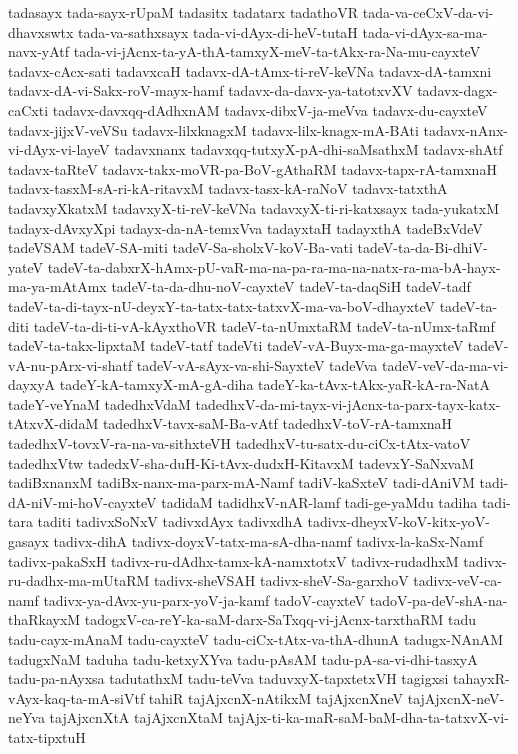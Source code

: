 {tadasayx
tada-sayx-rUpaM
tadasitx
tadatarx
tadathoVR
tada-va-ceCxV-da-vi-dhavxswtx
tada-va-sathxsayx
tada-vi-dAyx-di-heV-tutaH
tada-vi-dAyx-sa-ma-navx-yAtf
tada-vi-jAcnx-ta-yA-thA-tamxyX-meV-ta-tAkx-ra-Na-mu-cayxteV
tadavx-cAcx-sati
tadavxcaH
tadavx-dA-tAmx-ti-reV-keVNa
tadavx-dA-tamxni
tadavx-dA-vi-Sakx-roV-mayx-hamf
tadavx-da-davx-ya-tatotxvXV
tadavx-dagx-caCxti
tadavx-davxqq-dAdhxnAM
tadavx-dibxV-ja-meVva
tadavx-du-cayxteV
tadavx-jijxV-veVSu
tadavx-lilxknagxM
tadavx-lilx-knagx-mA-BAti
tadavx-nAnx-vi-dAyx-vi-layeV
tadavxnanx
tadavxqq-tutxyX-pA-dhi-saMsathxM
tadavx-shAtf
tadavx-taRteV
tadavx-takx-moVR-pa-BoV-gAthaRM
tadavx-tapx-rA-tamxnaH
tadavx-tasxM-sA-ri-kA-ritavxM
tadavx-tasx-kA-raNoV
tadavx-tatxthA
tadavxyXkatxM
tadavxyX-ti-reV-keVNa
tadavxyX-ti-ri-katxsayx
tada-yukatxM
tadayx-dAvxyXpi
tadayx-da-nA-temxVva
tadayxtaH
tadayxthA
tadeBxVdeV
tadeVSAM
tadeV-SA-miti
tadeV-Sa-sholxV-koV-Ba-vati
tadeV-ta-da-Bi-dhiV-yateV
tadeV-ta-dabxrX-hAmx-pU-vaR-ma-na-pa-ra-ma-na-natx-ra-ma-bA-hayx-ma-ya-mAtAmx
tadeV-ta-da-dhu-noV-cayxteV
tadeV-ta-daqSiH
tadeV-tadf
tadeV-ta-di-tayx-nU-deyxY-ta-tatx-tatx-tatxvX-ma-va-boV-dhayxteV
tadeV-ta-diti
tadeV-ta-di-ti-vA-kAyxthoVR
tadeV-ta-nUmxtaRM
tadeV-ta-nUmx-taRmf
tadeV-ta-takx-lipxtaM
tadeV-tatf
tadeVti
tadeV-vA-Buyx-ma-ga-mayxteV
tadeV-vA-nu-pArx-vi-shatf
tadeV-vA-sAyx-va-shi-SayxteV
tadeVva
tadeV-veV-da-ma-vi-dayxyA
tadeY-kA-tamxyX-mA-gA-diha
tadeY-ka-tAvx-tAkx-yaR-kA-ra-NatA
tadeY-veYnaM
tadedhxVdaM
tadedhxV-da-mi-tayx-vi-jAcnx-ta-parx-tayx-katx-tAtxvX-didaM
tadedhxV-tavx-saM-Ba-vAtf
tadedhxV-toV-rA-tamxnaH
tadedhxV-tovxV-ra-na-va-sithxteVH
tadedhxV-tu-satx-du-ciCx-tAtx-vatoV
tadedhxVtw
tadedxV-sha-duH-Ki-tAvx-dudxH-KitavxM
tadevxY-SaNxvaM
tadiBxnanxM
tadiBx-nanx-ma-parx-mA-Namf
tadiV-kaSxteV
tadi-dAniVM
tadi-dA-niV-mi-hoV-cayxteV
tadidaM
tadidhxV-nAR-lamf
tadi-ge-yaMdu
tadiha
tadi-tara
taditi
tadivxSoNxV
tadivxdAyx
tadivxdhA
tadivx-dheyxV-koV-kitx-yoV-gasayx
tadivx-dihA
tadivx-doyxV-tatx-ma-sA-dha-namf
tadivx-la-kaSx-Namf
tadivx-pakaSxH
tadivx-ru-dAdhx-tamx-kA-namxtotxV
tadivx-rudadhxM
tadivx-ru-dadhx-ma-mUtaRM
tadivx-sheVSAH
tadivx-sheV-Sa-garxhoV
tadivx-veV-ca-namf
tadivx-ya-dAvx-yu-parx-yoV-ja-kamf
tadoV-cayxteV
tadoV-pa-deV-shA-na-thaRkayxM
tadogxV-ca-reY-ka-saM-darx-SaTxqq-vi-jAcnx-tarxthaRM
tadu
tadu-cayx-mAnaM
tadu-cayxteV
tadu-ciCx-tAtx-va-thA-dhunA
tadugx-NAnAM
tadugxNaM
taduha
tadu-ketxyXYva
tadu-pAsAM
tadu-pA-sa-vi-dhi-tasxyA
tadu-pa-nAyxsa
tadutathxM
tadu-teVva
taduvxyX-tapxtetxVH
tagigxsi
tahayxR-vAyx-kaq-ta-mA-siVtf
tahiR
tajAjxcnX-nAtikxM
tajAjxcnXneV
tajAjxcnX-neV-neYva
tajAjxcnXtA
tajAjxcnXtaM
tajAjx-ti-ka-maR-saM-baM-dha-ta-tatxvX-vi-tatx-tipxtuH
}
